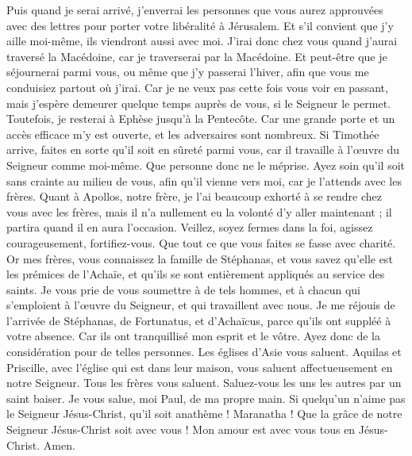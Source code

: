 \begin{multicols}{2}
Puis quand je serai arrivé, j'enverrai les personnes que vous aurez approuvées avec des lettres pour porter votre libéralité à Jérusalem.
Et s'il convient que j'y aille moi-même, ils viendront aussi avec moi.
J'irai donc chez vous quand j'aurai traversé la Macédoine, car je traverserai par la Macédoine.
Et peut-être que je séjournerai parmi vous, ou même que j'y passerai l'hiver, afin que vous me conduisiez partout où j'irai.
Car je ne veux pas cette fois vous voir en passant, mais j'espère demeurer quelque temps auprès de vous, si le Seigneur le permet.
Toutefois, je resterai à Ephèse jusqu'à la Pentecôte.
Car une grande porte et un accès efficace m'y est ouverte, et les adversaires sont nombreux.
Si Timothée arrive, faites en sorte qu'il soit en sûreté parmi vous, car il travaille à l'œuvre du Seigneur comme moi-même.
Que personne donc ne le méprise. Ayez soin qu'il soit sans crainte au milieu de vous, afin qu'il vienne vers moi, car je l'attends avec les frères.
Quant à Apollos, notre frère, je l'ai beaucoup exhorté à se rendre chez vous avec les frères, mais il n'a nullement eu la volonté d'y aller maintenant ; il partira quand il en aura l'occasion.
Veillez, soyez fermes dans la foi, agissez courageusement, fortifiez-vous.
Que tout ce que vous faites se fasse avec charité.
Or mes frères, vous connaissez la famille de Stéphanas, et vous savez qu'elle est les prémices de l'Achaïe, et qu'ils se sont entièrement appliqués au service des saints.
Je vous prie de vous soumettre à de tels hommes, et à chacun qui s'emploient à l'œuvre du Seigneur, et qui travaillent avec nous.
Je me réjouis de l'arrivée de Stéphanas, de Fortunatus, et d'Achaïcus, parce qu'ils ont suppléé à votre absence.
Car ils ont tranquillisé mon esprit et le vôtre. Ayez donc de la considération pour de telles personnes.
Les églises d'Asie vous saluent. Aquilas et Priscille, avec l'église qui est dans leur maison, vous saluent affectueusement en notre Seigneur.
Tous les frères vous saluent. Saluez-vous les uns les autres par un saint baiser.
Je vous salue, moi Paul, de ma propre main.
Si quelqu'un n'aime pas le Seigneur Jésus-Christ, qu'il soit anathème ! Maranatha !
Que la grâce de notre Seigneur Jésus-Christ soit avec vous !
Mon amour est avec vous tous en Jésus-Christ. Amen.
\PPE{}
\end{multicols}
